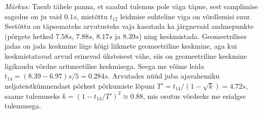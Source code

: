 \documentclass[11pt,a5paper]{article}
\begin{document}
\emph{Märkus:} Tasub tähele panna, et saadud tulemus pole väga täpne, sest samplimise sagedus on ju vaid $\SI{0.1}s$, mistõttu $t_{12}$ leidmise suhteline viga on võrdlemisi suur. Seetõttu on täpsemateks arvutusteks vaja kasutada ka järgnevaid andmepunkte (põrgete hetked $\SI{7.58}s$, $\SI{7.88}s$, $\SI{8.17}s$ ja $\SI{8.39}s$) ning keskmistada. Geomeetrilises jadas on jada keskmine liige kõigi liikmete geomeetriline keskmine, aga kui keskmistatavad arvud erinevad üksteisest vähe, siis on geomeetriline keskmine ligikaudu võrdne aritmeetilise keskmisega. Seega me võime leida $t_{14}=(\num{8.39}-\num{6.97})\unit{s}/5= \SI{0.284}s$. Arvutades nüüd juba ajavahemiku neljateistkümnendast põrkest põrkumiste lõpuni $T'=t_{14}/(1-\sqrt k)=\SI{4.72}s$, saame tulemuseks $k=(1-t_{14}/T')^2\approx 0.88$, mis osutus võrdseks me esialgse tulemusega.
\end{document}

